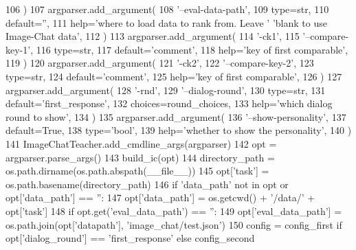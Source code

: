 \begin{DoxyCode}
106     )
107     argparser.add\_argument(
108         \textcolor{stringliteral}{'--eval-data-path'},
109         type=str,
110         default=\textcolor{stringliteral}{''},
111         help=\textcolor{stringliteral}{'where to load data to rank from. Leave '} \textcolor{stringliteral}{'blank to use Image-Chat data'},
112     )
113     argparser.add\_argument(
114         \textcolor{stringliteral}{'-ck1'},
115         \textcolor{stringliteral}{'--compare-key-1'},
116         type=str,
117         default=\textcolor{stringliteral}{'comment'},
118         help=\textcolor{stringliteral}{'key of first comparable'},
119     )
120     argparser.add\_argument(
121         \textcolor{stringliteral}{'-ck2'},
122         \textcolor{stringliteral}{'--compare-key-2'},
123         type=str,
124         default=\textcolor{stringliteral}{'comment'},
125         help=\textcolor{stringliteral}{'key of first comparable'},
126     )
127     argparser.add\_argument(
128         \textcolor{stringliteral}{'-rnd'},
129         \textcolor{stringliteral}{'--dialog-round'},
130         type=str,
131         default=\textcolor{stringliteral}{'first\_response'},
132         choices=round\_choices,
133         help=\textcolor{stringliteral}{'which dialog round to show'},
134     )
135     argparser.add\_argument(
136         \textcolor{stringliteral}{'--show-personality'},
137         default=\textcolor{keyword}{True},
138         type=\textcolor{stringliteral}{'bool'},
139         help=\textcolor{stringliteral}{'whether to show the personality'},
140     )
141     ImageChatTeacher.add\_cmdline\_args(argparser)
142     opt = argparser.parse\_args()
143     build\_ic(opt)
144     directory\_path = os.path.dirname(os.path.abspath(\_\_file\_\_))
145     opt[\textcolor{stringliteral}{'task'}] = os.path.basename(directory\_path)
146     \textcolor{keywordflow}{if} \textcolor{stringliteral}{'data\_path'} \textcolor{keywordflow}{not} \textcolor{keywordflow}{in} opt \textcolor{keywordflow}{or} opt[\textcolor{stringliteral}{'data\_path'}] == \textcolor{stringliteral}{''}:
147         opt[\textcolor{stringliteral}{'data\_path'}] = os.getcwd() + \textcolor{stringliteral}{'/data/'} + opt[\textcolor{stringliteral}{'task'}]
148     \textcolor{keywordflow}{if} opt.get(\textcolor{stringliteral}{'eval\_data\_path'}) == \textcolor{stringliteral}{''}:
149         opt[\textcolor{stringliteral}{'eval\_data\_path'}] = os.path.join(opt[\textcolor{stringliteral}{'datapath'}], \textcolor{stringliteral}{'image\_chat/test.json'})
150     config = config\_first \textcolor{keywordflow}{if} opt[\textcolor{stringliteral}{'dialog\_round'}] == \textcolor{stringliteral}{'first\_response'} \textcolor{keywordflow}{else} config\_second

\end{DoxyCode}
